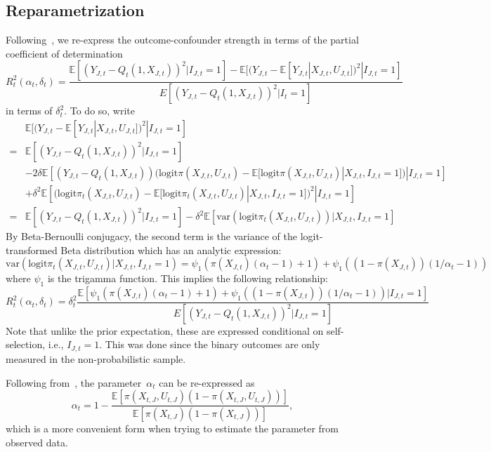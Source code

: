 \documentclass[11pt]{amsart}
\numberwithin{equation}{section}
\theoremstyle{plain}
\def\logit{\text{logit}}
\def\EE{\mathbb{E}}
\begin{document}
\subsection{Reparametrization}

Following~\cite{Veitch2020}, we re-express the outcome-confounder strength in terms of the partial coefficient of determination
$$
R_t^2 (\alpha_t, \delta_t) = \frac{\EE [( Y_{J,t} - Q_t(1,X_{J,t}) )^2 | I_{J,t}=1 ] - \EE[ (Y_{J,t} - \EE[ Y_{J,t} | X_{J,t}, U_{J,t} ])^2 | I_{J,t} = 1]}{E[(Y_{J,t} - Q_t(1,X_{J,t}))^2 | I_t = 1]}
$$
in terms of $\delta_t^2$. To do so, write
\begin{align*}
&\EE [ (Y_{J,t} - \EE[ Y_{J,t} | X_{J,t}, U_{J,t}] )^2 | I_{J,t} = 1 ] \\
= &\EE [ (Y_{J,t} - Q_t(1,X_{J,t}))^2 | I_{J,t} = 1 ] \\
&- 2 \delta \EE \left[ (Y_{J,t} - Q_t(1,X_{J,t})) (\logit \pi(X_{J,t},U_{J,t}) - \EE[ \logit \pi (X_{J,t},U_{J,t}) | X_{J,t}, I_{J,t}=1 ]) | I_{J,t} = 1 \right] \\
&+ \delta^2 \EE \left[ (\logit \pi_t(X_{J,t},U_{J,t}) - \EE[ \logit \pi_t (X_{J,t},U_{J,t}) | X_{J,t}, I_{J,t}=1 ])^2 | I_{J,t} = 1 \right] \\
= &\EE [ (Y_{J,t} - Q_t(1,X_{J,t}))^2 | I_{J,t} = 1 ] - \delta^2 \EE \left[ \text{var} \left( \logit \pi_t(X_{J,t},U_{J,t}) \right) | X_{J,t}, I_{J,t} = 1 \right]
\end{align*}
By Beta-Bernoulli conjugacy, the second term is the variance of the logit-transformed Beta distribution which has an analytic expression:
$$
\text{var} \left( \logit \pi_t(X_{J,t},U_{J,t}) | X_{J,t}, I_{J,t} = 1 \right) = \psi_1 ( \pi(X_{J,t}) (\alpha_t - 1) + 1 ) + \psi_1 ( (1- \pi(X_{J,t})) (1/\alpha_t - 1))
$$
where $\psi_1$ is the trigamma function. This implies the following relationship:
\begin{equation}
\label{eq:partialcoef}
R_t^2 (\alpha_t, \delta_t) = \delta_t^2 \frac{\EE [\psi_1 ( \pi(X_{J,t}) (\alpha_t - 1) + 1 ) + \psi_1 ( (1- \pi(X_{J,t})) (1/\alpha_t - 1)) | I_{J,t} = 1 ] }{E [(Y_{J,t}- Q_t(1,X_{J,t}))^2 | I_{J,t} = 1]}
\end{equation}
Note that unlike the prior expectation, these are expressed conditional on self-selection, i.e., $I_{J,t} = 1$.  This was done since the binary outcomes are only measured in the non-probabilistic sample.

Following from~\cite[Theorem 5]{Veitch2020}, the parameter~$\alpha_t$ can be re-expressed as
\begin{equation}
\label{eq:alphaest}
\alpha_t = 1 - \frac{\EE \left[ \pi (X_{t,J},U_{t,J}) \left( 1 - \pi (X_{t,J},U_{t,J}) \right)  \right]}{\EE\left[ \pi (X_{t,J}) \left( 1 - \pi (X_{t,J}) \right) \right] },
\end{equation}
which is a more convenient form when trying to estimate the parameter from observed data.
\end{document}
